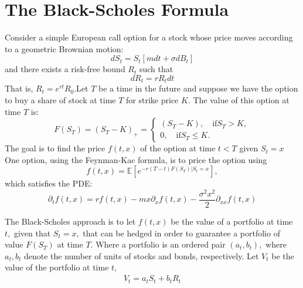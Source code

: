 \documentclass[oneside]{book}
\newcommand{\bbE}{\mathbb{E}}
\begin{document}

\section{The Black-Scholes Formula}
Consider a simple European call option for a stock whose price moves according to a geometric Brownian motion:
\[dS_t = S_t[mdt + \sigma dB_t]\] and there exists a risk-free bound $R_t$ such that
\[dR_t = rR_t dt\]
That is, $R_t = e^{rt}R_0.$\newline\newline Let $T$ be a time in the future and suppose we have the option to buy a share of stock at time $T$ for strike price $K.$ The value of this option at time $T$ is:
\[F(S_T) = (S_T - K)_+ = \begin{cases}
    (S_T - K), \quad \text{if} S_T >K,\\
    0, \quad \text{if} S_T \leq K.
\end{cases}\]
The goal is to find the price $f(t,x)$ of the option at time $t<T$ given $S_t = x$
One option, using the Feynman-Kac formula, is to price the option using
\[f(t,x) = \bbE[e^{-r(T - t)F(S_T) | S_t =x}],\] which satisfies the PDE:
\[\partial_t f(t,x) = rf(t,x) - mx\partial_x f(t,x) - \frac{\sigma^2 x^2}{2}\partial_{xx}f(t,x)\]

The Black-Scholes approach is to let $f(t,x)$ be the value of a portfolio at time $t,$ given that $S_t = x,$ that can be hedged in order to guarantee a portfolio of value $F(S_T)$ at time $T.$ Where a portfolio is an ordered pair $(a_t, b_t),$ where $a_t, b_t$ denote the number of units of stocks and bonds, respectively. Let $V_t$ be the value of the portfolio at time $t,$
\begin{align}
    V_t = a_tS_t + b_tR_t
\end{align}
\end{document}

